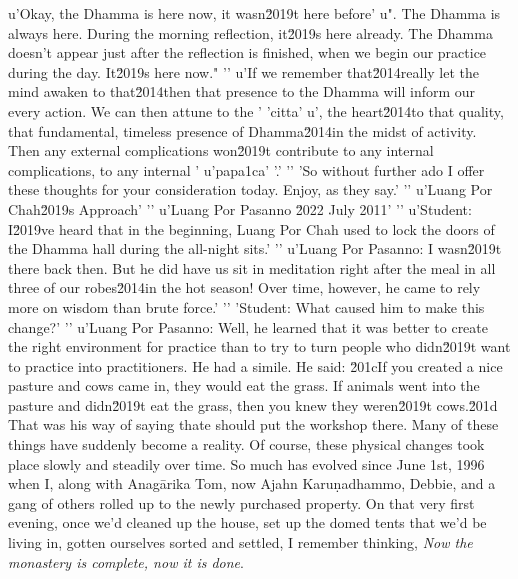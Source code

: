 {u'Okay, the Dhamma is here now, it wasn\u2019t here before'
u". The Dhamma is always here. During the morning reflection, it\u2019s here already. The Dhamma doesn't appear just after the reflection is finished, when we begin our practice during the day. It\u2019s here now."
'\n'
u'If we remember that\u2014really let the mind awaken to that\u2014then that presence to the Dhamma will inform our every action. We can then attune to the '
'citta'
u', the heart\u2014to that quality, that fundamental, timeless presence of Dhamma\u2014in the midst of activity. Then any external complications won\u2019t contribute to any internal complications, to any internal '
u'papa\xf1ca'
'.'
'\n'
'So without further ado I offer these thoughts for your consideration today. Enjoy, as they say.'
'\n'
u'Luang Por Chah\u2019s Approach'
'\n'
u'Luang Por Pasanno \u2022 July 2011'
'\n'
u'Student: I\u2019ve heard that in the beginning, Luang Por Chah used to lock the doors of the Dhamma hall during the all-night sits.'
'\n'
u'Luang Por Pasanno: I wasn\u2019t there back then. But he did have us sit in meditation right after the meal in all three of our robes\u2014in the hot season! Over time, however, he came to rely more on wisdom than brute force.'
'\n'
'Student: What caused him to make this change?'
'\n'
u'Luang Por Pasanno: Well, he learned that it was better to create the right environment for practice than to try to turn people who didn\u2019t want to practice into practitioners. He had a simile. He said: \u201cIf you created a nice pasture and cows came in, they would eat the grass. If animals went into the pasture and didn\u2019t eat the grass, then you knew they weren\u2019t cows.\u201d That was his way of saying thate should put the workshop 
there}. Many of these things have suddenly become a reality. Of course, 
these physical changes took place slowly and steadily over time. So 
much has evolved since June 1st, 1996 when I, along with Anagārika 
Tom, now Ajahn Karuṇadhammo, Debbie, and a gang of others rolled up 
to the newly purchased property. On that very first evening, once we'd 
cleaned up the house, set up the domed tents that we'd be living in, 
gotten ourselves sorted and settled, I remember thinking, \emph{Now the 
monastery is complete, now it is done}.

